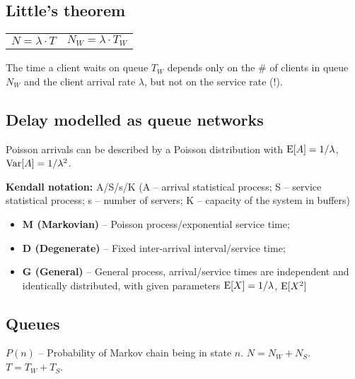 \documentclass{form}
\begin{document}
\noindent
\begin{minipage}[c]{0.39\textwidth}
    \begin{minipage}{35mm} \subsection*{Little's theorem} \end{minipage}
    \begin{minipage}{40mm}
        \begin{tabular}{@{}c c@{}}
            $N = \lambda \cdot T$ &
            $N_W = \lambda \cdot T_W$
        \end{tabular}
    \end{minipage}

    The time a client waits on queue $T_W$ depends only on the \# of clients in queue $N_W$ and the client arrival rate $\lambda$, but not on the service rate (!).

    \subsection*{Delay modelled as queue networks}

    Poisson arrivals can be described by a Poisson distribution with $\operatorname{E}[A]=1/\lambda$, $\operatorname{Var}[A]=1/\lambda^2$.
\end{minipage}
\begin{minipage}[c]{0.60\textwidth}
    \noindent
    \textbf{Kendall notation:} A/S/s/K (A -- arrival statistical process; S -- service statistical process; s -- number of servers; K -- capacity of the system in buffers)

    \noindent
    \begin{itemize}
        \setlength\itemsep{0em}
        \item \textbf{M (Markovian)} -- Poisson process/exponential service time;
        \item \textbf{D (Degenerate)} -- Fixed inter-arrival interval/service time;
        \item \textbf{G (General)} -- General process, arrival/service times are independent and identically distributed, with given parameters $\operatorname{E}[X]=1/\lambda$, $\operatorname{E}[X^2]$
    \end{itemize}
\end{minipage}%

\pagebreak

\noindent
\begin{minipage}{0.1\textwidth}
    \subsection*{Queues}
\end{minipage}%
\begin{minipage}{0.9\textwidth}
    $P(n)$ -- Probability of Markov chain being in state $n$.
    $N = N_W + N_S$.
    $T = T_W + T_S$.
\end{minipage}
\end{document}
